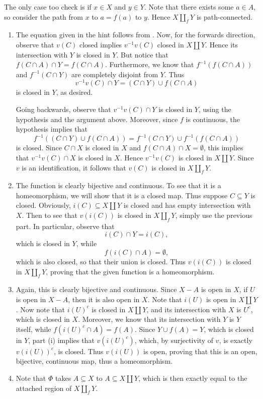 \documentclass[../../solutions.tex]{subfiles}
\begin{document}
\begin{exercise} \leavevmode
The only case too check is if $x\in X$ and $y\in Y$.
Note that there exists some $a\in A$, so consider the path from $x$ to $a=f(a)$ to $y$.
Hence $X\amalg_fY$ is path-connected.
\end{exercise}

\begin{exercise} \leavevmode
\begin{enumerate}
\item
The equation given in the hint follows from .
Now, for the forwards direction, observe that $v(C)$ closed implies $v^{-1}v(C)$ closed in $X\amalg Y$.
Hence its intersection with $Y$ is closed in $Y$.
But notice that $f(C\cap A)\cap Y=f(C\cap A)$.
Furthermore, we know that $f^{-1}(f(C\cap A))$ and $f^{-1}(C\cap Y)$ are completely disjoint from $Y$.
Thus
\[v^{-1}v(C)\cap Y=(C\cap Y)\cup f(C\cap A)\]
is closed in $Y$, as desired.

Going backwards, observe that $v^{-1}v(C)\cap Y$ is closed in $Y$, using the hypothesis and the argument above.
Moreover, since $f$ is continuous, the hypothesis implies that
\[f^{-1}((C\cap Y)\cup f(C\cap A))=f^{-1}(C\cap Y)\cup f^{-1}(f(C\cap A))\]
is closed.
Since $C\cap X$ is closed in $X$ and $f(C\cap A)\cap X=\emptyset$, this implies that $v^{-1}v(C)\cap X$ is closed in $X$.
Hence $v^{-1}v(C)$ is closed in $X\amalg Y$.
Since $v$ is an identification, it follows that $v(C)$ is closed in $X\amalg_fY$.

\item
The function is clearly bijective and continuous.
To see that it is a homeomorphism, we will show that it is a closed map.
Thus suppose $C\subseteq Y$ is closed.
Obviously, $i(C)\subseteq X\amalg Y$ is closed and has empty intersection with $X$.
Then to see that $v(i(C))$ is closed in $X\amalg_fY$, simply use the previous part.
In particular, observe that
\[i(C)\cap Y=i(C),\]
which is closed in $Y$, while
\[f(i(C)\cap A)=\emptyset,\]
which is also closed, so that their union is closed.
Thus $v(i(C))$ is closed in $X\amalg_fY$, proving that the given function is a homeomorphism.

\item
Again, this is clearly bijective and continuous.
Since $X-A$ is open in $X$, if $U$ is open in $X-A$, then it is also open in $X$.
Note that $i(U)$ is open in $X\amalg Y$.
Now note that $i(U)^c$ is closed in $X\amalg Y$, and its intersection with $X$ is $U^c$, which is closed in $X$.
Moreover, we know that its intersection with $Y$ is $Y$ itself, while $f(i(U)^c\cap A)=f(A)$.
Since $Y\cup f(A)=Y$, which is closed in $Y$, part (i) implies that $v(i(U)^c)$, which, by surjectivity of $v$, is exactly $v(i(U))^c$, is closed.
Thus $v(i(U))$ is open, proving that this is an open, bijective, continuous map, thus a homeomorphism.

\item
Note that $\Phi$ takes $A\subseteq X$ to $A\subseteq X\amalg Y$, which is then exactly equal to the attached region of $X\amalg_fY$.
\end{enumerate}
\end{exercise}
\end{document}
